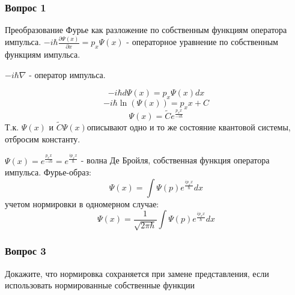 \subsubsection{Вопрос 1}
Преобразование Фурье как разложение по собственным функциям оператора импульса.
$-i\hbar \frac{\partial{\Psi(x)}}{\partial x}=p_x \Psi(x)$ - операторное уравнение по собственным функциям импульса.

$-i\hbar \nabla$ - оператор импульса.

$$-i\hbar d\Psi(x)=p_x \Psi(x)dx$$
$$-i\hbar \ln(\Psi(x))=p_xx +C$$
$$\Psi(x)=\widetilde{C} e^{\frac{p_xx}{-i\hbar}}$$
Т.к. $\Psi(x)$ и $\widetilde{C} \Psi(x)$описывают одно и то же состояние квантовой системы, отбросим константу. 

$\Psi(x)=e^{\frac{p_xx}{-i\hbar}}=e^{\frac{ip_xx}{\hbar}}$ - волна Де Бройля, собственная функция оператора импульса. Фурье-образ:
$$\Psi(x)=\int \Psi(p) e^{\frac{ip_xx}{\hbar}} dx$$
 учетом нормировки в одномерном случае:
 $$\Psi(x)=\frac{1}{\sqrt{2\pi \hbar}}\int \Psi(p) e^{\frac{ip_xx}{\hbar}} dx$$
\subsubsection{Вопрос 3}
Докажите, что нормировка сохраняется при замене представления, если использовать нормированные собственные функции  
	